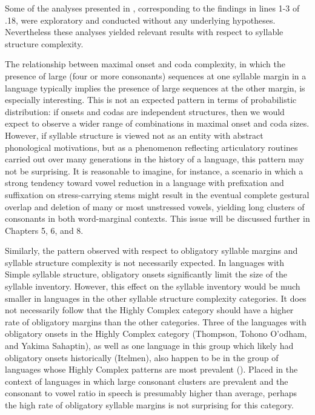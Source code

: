   Some of the analyses presented in , corresponding to the findings in lines 1-3 of .18, were exploratory and conducted without any underlying hypotheses. Nevertheless these analyses yielded relevant results with respect to syllable structure complexity.



  The relationship between maximal onset and coda complexity, in which the presence of large (four or more consonants) sequences at one syllable margin in a language typically implies the presence of large sequences at the other margin, is especially interesting. This is not an expected pattern in terms of probabilistic distribution: if onsets and codas are independent structures, then we would expect to observe a wider range of combinations in maximal onset and coda sizes. However, if syllable structure is viewed not as an entity with abstract phonological motivations, but as a phenomenon reflecting articulatory routines carried out over many generations in the history of a language, this pattern may not be surprising. It is reasonable to imagine, for instance, a scenario in which a strong tendency toward vowel reduction in a language with prefixation and suffixation on stress-carrying stems might result in the eventual complete gestural overlap and deletion of many or most unstressed vowels, yielding long clusters of consonants in both word-marginal contexts. This issue will be discussed further in Chapters 5, 6, and 8.



  Similarly, the pattern observed with respect to obligatory syllable margins and syllable structure complexity is not necessarily expected. In languages with Simple syllable structure, obligatory onsets significantly limit the size of the syllable inventory. However, this effect on the syllable inventory would be much smaller in languages in the other syllable structure complexity categories. It does not necessarily follow that the Highly Complex category should have a higher rate of obligatory margins than the other categories. Three of the languages with obligatory onsets in the Highly Complex category (Thompson, Tohono O’odham, and Yakima Sahaptin), as well as one language in this group which likely had obligatory onsets historically (Itelmen), also happen to be in the group of languages whose Highly Complex patterns are most prevalent (). Placed in the context of languages in which large consonant clusters are prevalent and the consonant to vowel ratio in speech is presumably higher than average, perhaps the high rate of obligatory syllable margins is not surprising for this category.



